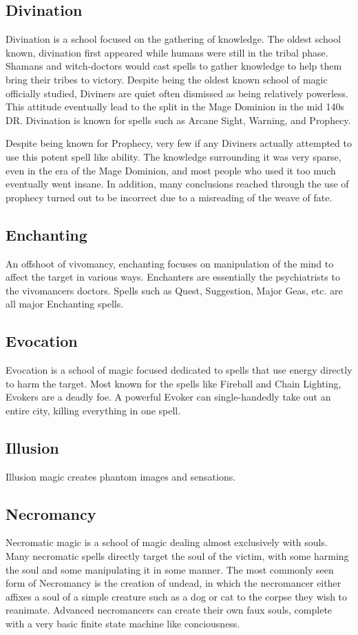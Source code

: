 \documentclass{article}
\begin{document}
\subsection{Divination}
Divination is a school focused on the gathering of knowledge. The oldest school known, divination first appeared while humans were still in the tribal phase. Shamans and witch-doctors would cast spells to gather knowledge to help them bring their tribes to victory. Despite being the oldest known school of magic officially studied, Diviners are quiet often dismissed as being relatively powerless. This attitude eventually lead to the split in the Mage Dominion in the mid 140s DR. Divination is known for spells such as Arcane Sight, Warning, and Prophecy.

Despite being known for Prophecy, very few if any Diviners actually attempted to use this potent spell like ability. The knowledge surrounding it was very sparse, even in the era of the Mage Dominion, and most people who used it too much eventually went insane. In addition, many conclusions reached through the use of prophecy turned out to be incorrect due to a misreading of the weave of fate.

\subsection{Enchanting}
An offshoot of vivomancy, enchanting focuses on manipulation of the mind to affect the target in various ways. Enchanters are essentially the psychiatrists to the vivomancers doctors.
Spells such as Quest, Suggestion, Major Geas, etc. are all major Enchanting spells.

\subsection{Evocation}
Evocation is a school of magic focused dedicated to spells that use energy directly to harm the target. Most known for the spells like Fireball and Chain Lighting, Evokers are a deadly foe. A powerful Evoker can single-handedly take out an entire city, killing everything in one spell.

\subsection{Illusion}
Illusion magic creates phantom images and sensations.

\subsection{Necromancy}
Necromatic magic is a school of magic dealing almost exclusively with souls. Many necromatic spells directly target the soul of the victim, with some harming the soul and some manipulating it in some manner. The most commonly seen form of Necromancy is the creation of undead, in which the necromancer either affixes a soul of a simple creature such as a dog or cat to the corpse they wish to reanimate. Advanced necromancers can create their own faux souls, complete with a very basic finite state machine like conciousness.
\end{document}
